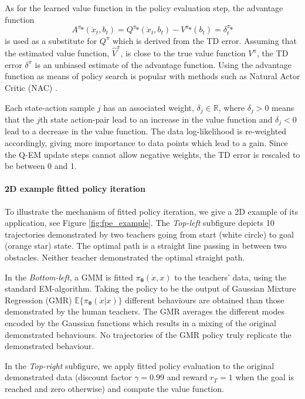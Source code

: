 \documentclass[final,5p,times,twocolumn]{elsarticle}
\newcommand{\X}{x}
\newcommand{\B}{b}
\newcommand{\U}{\dot{x}}
\newcommand{\Param}{\boldsymbol{\theta}}
\begin{document}
As for the learned value function in the policy evaluation step, the advantage function
\begin{equation}\label{eq:advantage_f}
 A^{\pi_{\Param}}(\U_t,\B_t) =  Q^{\pi_{\Param}}(\U_t,\B_t) - V^{\pi_{\Param}}(\B_t) = \delta^{\pi_{\Param}}_t
\end{equation}
is used as a substitute for $Q^{\pi}$ which is derived from the TD error. Assuming that the estimated 
value function, $\hat{V}^{\pi}$, is close to the true value function $V^{\pi}$, the 
TD error $\delta^{\pi}$ is an unbiased estimate of the advantage function. Using the 
advantage function as means of policy search is popular with methods such as Natural Actor Critic (NAC) \cite{peter_nac_2008}.

Each state-action sample $j$ has an associated weight, $\delta_j \in \mathbb{R}$, where $\delta_j > 0$ means that the 
$j$th state action-pair lead to an increase in the value function and $\delta_j < 0$ lead to 
a decrease in the value function. The data log-likelihood is re-weighted accordingly, giving more importance to data points which lead to a gain. Since 
the Q-EM update steps cannot allow negative weights, the TD error is rescaled to be between 0 and 1. 


\paragraph{2D example fitted policy iteration}

To illustrate the mechanism of fitted policy iteration, we give a 2D example 
of its application, see Figure \ref{fig:fpe_example}. The \textit{Top-left} subfigure
depicts 10 trajectories demonstrated by two teachers going from start (white circle) to goal (orange star) state. 
The optimal path is a straight line passing in between two obstacles. 
Neither teacher demonstrated the optimal straight path. 

In the \textit{Bottom-left}, a GMM is fitted $\pi_{\Param}(\U,\X)$ to the teachers' data, using the standard EM-algorithm.
Taking the policy to be the output of Gaussian Mixture Regression (GMR) $\mathbb{E}\{\pi_{\Param}(\U|\X)\}$ different
behaviours are obtained than those demonstrated by the human teachers. The GMR averages the different modes encoded by the Gaussian functions 
which results in a mixing of the original demonstrated behaviours. No trajectories of the GMR policy truly replicate 
the demonstrated behaviour. 

In the \textit{Top-right} subfigure, we apply fitted policy evaluation to the original demonstrated data (discount 
factor $\gamma=0.99$ and reward $r_{T}=1$ when the goal is reached and zero otherwise) and compute the value function.
\end{document}
